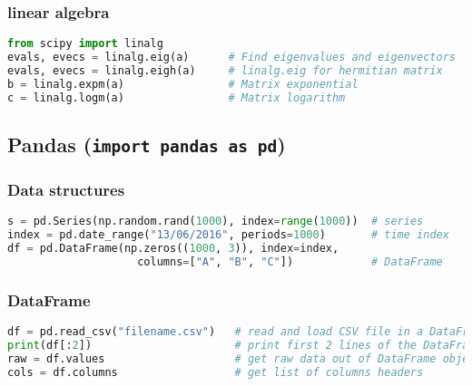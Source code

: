 \documentclass[]{article}
\begin{document}
\subsubsection{linear algebra}\label{linear-algebra}

\begin{lstlisting}[language=Python]
from scipy import linalg
evals, evecs = linalg.eig(a)      # Find eigenvalues and eigenvectors
evals, evecs = linalg.eigh(a)     # linalg.eig for hermitian matrix
b = linalg.expm(a)                # Matrix exponential
c = linalg.logm(a)                # Matrix logarithm
\end{lstlisting}

\subsection{\texorpdfstring{Pandas
(\texttt{import\ pandas\ as\ pd})}{Pandas (import pandas as pd)}}\label{pandas-import-pandas-as-pd}

\subsubsection{Data structures}\label{data-structures}

\begin{lstlisting}[language=Python]
s = pd.Series(np.random.rand(1000), index=range(1000))  # series
index = pd.date_range("13/06/2016", periods=1000)       # time index
df = pd.DataFrame(np.zeros((1000, 3)), index=index,
                    columns=["A", "B", "C"])            # DataFrame
\end{lstlisting}

\subsubsection{DataFrame}\label{dataframe}

\begin{lstlisting}[language=Python]
df = pd.read_csv("filename.csv")   # read and load CSV file in a DataFrame
print(df[:2])                      # print first 2 lines of the DataFrame
raw = df.values                    # get raw data out of DataFrame object
cols = df.columns                  # get list of columns headers
\end{lstlisting}
\end{document}
